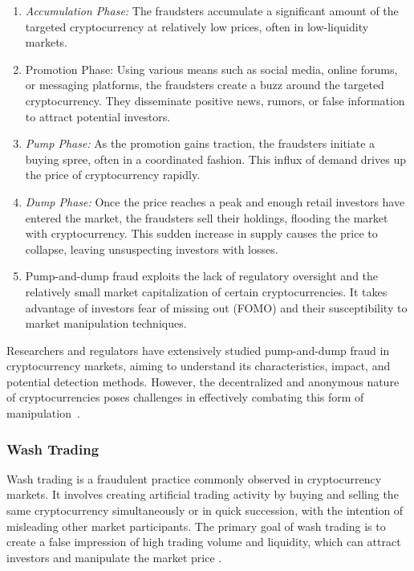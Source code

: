 \begin{enumerate}
    \item \textit{Accumulation Phase:} The fraudsters accumulate a significant amount of the targeted cryptocurrency at
    relatively low prices, often in low-liquidity markets.
    \item Promotion Phase: Using various means such as social media, online forums, or messaging platforms, the fraudsters
    create a buzz around the targeted cryptocurrency. They disseminate positive news, rumors, or false information to attract
    potential investors.
    \item \textit{Pump Phase:} As the promotion gains traction, the fraudsters initiate a buying spree, often in a coordinated fashion.
    This influx of demand drives up the price of cryptocurrency rapidly.
    \item \textit{Dump Phase:} Once the price reaches a peak and enough retail investors have entered the market, the fraudsters
    sell their holdings, flooding the market with cryptocurrency. This sudden increase in supply causes the price to collapse,
    leaving unsuspecting investors with losses.
    \item Pump-and-dump fraud exploits the lack of regulatory oversight and the relatively small market capitalization of
    certain cryptocurrencies. It takes advantage of investors fear of missing out (FOMO) and their susceptibility to market
    manipulation techniques.
\end{enumerate}

Researchers and regulators have extensively studied pump-and-dump fraud in cryptocurrency markets, aiming to understand
its characteristics, impact, and potential detection methods. However, the decentralized and anonymous nature of cryptocurrencies
poses challenges in effectively combating this form of manipulation~\cite{jin2020pump, yang2019pump}.

\subsubsection{Wash Trading}
Wash trading is a fraudulent practice commonly observed in cryptocurrency markets. It involves creating artificial trading
activity by buying and selling the same cryptocurrency simultaneously or in quick succession, with the intention of misleading
other market participants. The primary goal of wash trading is to create a false impression of high trading volume and liquidity,
which can attract investors and manipulate the market price \cite{gandal2018price}.

